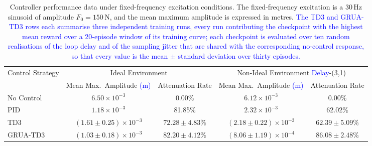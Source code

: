\begin{table}[htbp]
\centering
\caption{Controller performance data under fixed-frequency excitation conditions. The fixed-frequency excitation is a 30\,Hz sinusoid of amplitude $F_0=150\,\mathrm{N}$, and the mean maximum amplitude is expressed in metres. \textcolor{blue}{The TD3 and GRUA-TD3 rows each summarise three independent training runs, every run contributing the checkpoint with the highest mean reward over a 20-episode window of its training curve; each checkpoint is evaluated over ten random realisations of the loop delay and of the sampling jitter that are shared with the corresponding no-control response, so that every value is the mean $\pm$ standard deviation over thirty episodes.}}
\label{tab:fixed_freq_data}
\footnotesize
\setlength{\tabcolsep}{3.5pt}
\begin{tabular}{lcccc}
\toprule
\multirow{2}{*}{Control Strategy} & \multicolumn{2}{c}{Ideal Environment} & \multicolumn{2}{c}{Non-Ideal Environment \textcolor{blue}{Delay}-(3,1)} \\
\cline{2-5}
& Mean Max.\ Amplitude \textcolor{blue}{(m)} & Attenuation Rate & Mean Max.\ Amplitude \textcolor{blue}{(m)} & Attenuation Rate \\ \midrule
No Control & $6.50\times10^{-3}$ & 0.00\% & $6.12\times10^{-3}$ & 0.00\% \\
PID & $1.18\times10^{-3}$ & 81.85\% & $2.32\times10^{-3}$ & 62.02\% \\
TD3 & $(1.61\pm0.25)\times10^{-3}$ & $72.28\pm4.83$\% & $(2.18\pm0.22)\times10^{-3}$ & $62.39\pm5.09$\% \\
GRUA-TD3 & $(1.03\pm0.18)\times10^{-3}$ & $82.20\pm4.12$\% & $(8.06\pm1.19)\times10^{-4}$ & $86.08\pm2.48$\% \\
\bottomrule
\end{tabular}
\end{table}

